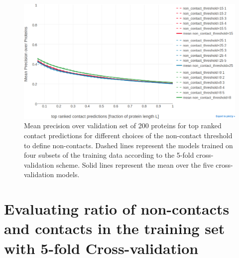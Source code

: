 \documentclass[11pt,a4paper,twoside]{book}
\theoremstyle{definition}
\theoremstyle{definition}
\theoremstyle{remark}
\begin{document}
\begin{figure}

{\centering \includegraphics[width=0.9\linewidth]{img/random_forest_contact_prior/cross_validation/precision_vs_rank_cv_on_test_random_forest_nestimators1000_maxfeatureslog2_maxdepth10_minsamplesleaf100_noncontactthr} 

}

\caption{Mean precision over
validation set of 200 proteins for top ranked contact predictions for
different choices of the non-contact threshold to define non-contacts.
Dashed lines represent the models trained on four subsets of the
training data according to the 5-fold cross-validation scheme. Solid
lines represent the mean over the five cross-validation models.}\label{fig:random-forest-noncontactthr-cv}
\end{figure}

\section{Evaluating ratio of non-contacts and contacts in the training
set with 5-fold Cross-validation}\label{rf-ratio-noncontacts}
\end{document}

